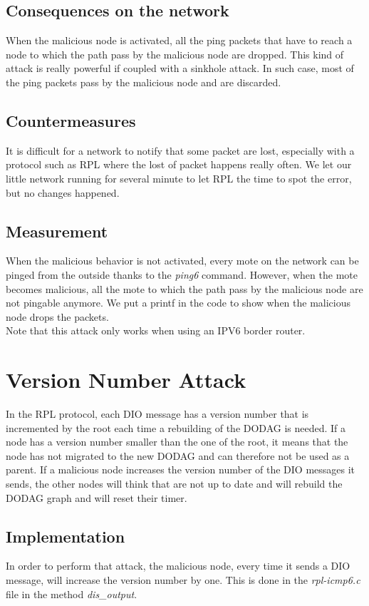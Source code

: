 \documentclass{report}
\begin{document}
\subsection*{Consequences on the network}
When the malicious node is activated, all the ping packets that have to reach a node to which the path pass by the malicious node are dropped. This kind of attack is really powerful if coupled with a sinkhole attack. In such case, most of the ping packets pass by the malicious node and are discarded. 
\subsection*{Countermeasures}
It is difficult for a network to notify that some packet are lost, especially with a protocol such as RPL where the lost of packet happens really often. We let our little network running for several minute to let RPL the time to spot the error, but no changes happened.

\subsection*{Measurement }
When the malicious behavior is not activated, every mote on the network can be pinged from the outside thanks to the \textit{ping6} command. However, when the mote becomes malicious, all the mote to which the path pass by the malicious node are not pingable anymore. We put a printf in the code to show when the malicious node drops the packets.\\ 
Note that this attack only works when using an IPV6 border router.

\section{Version Number Attack}
In the RPL protocol, each DIO message has a version number that is incremented by the root each time a rebuilding of the DODAG is needed. If a node has a version number smaller than the one of the root, it means that the node has not migrated to the new DODAG and can therefore not be used as a parent. If a malicious node increases the version number of the DIO messages it sends, the other nodes will think that are not up to date and will rebuild the DODAG graph and will reset their timer.

\subsection*{Implementation}
In order to perform that attack, the malicious node, every time it sends a DIO message, will increase the version number by one. This is done in the \textit{rpl-icmp6.c} file in the method \textit{dis\_output}.
\end{document}
